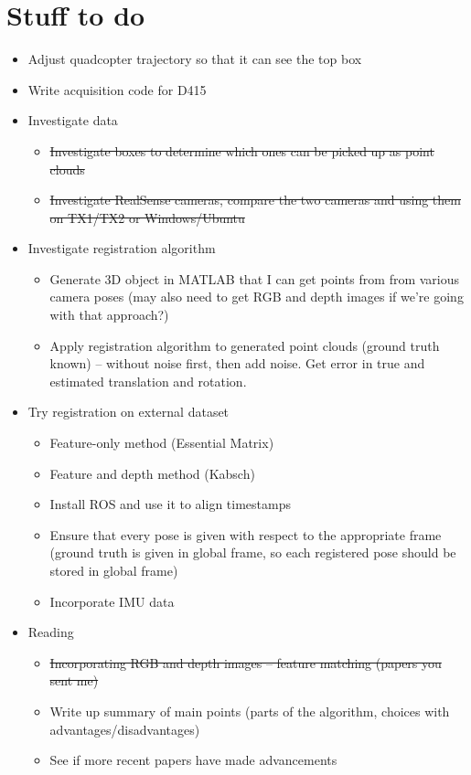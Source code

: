 \documentclass[12pt,a4paper]{article}
\begin{document}
\section{Stuff to do}
\begin{itemize}
\item Adjust quadcopter trajectory so that it can see the top box
\item Write acquisition code for D415
\item Investigate data
\begin{itemize}
\item \sout{Investigate boxes to determine which ones can be picked up as point clouds}
\item \sout{Investigate RealSense cameras, compare the two cameras and using them on TX1/TX2 or Windows/Ubuntu}
\end{itemize}
\item Investigate registration algorithm
\begin{itemize}
\item Generate 3D object in MATLAB that I can get points from from various camera poses (may also need to get RGB and depth images if we're going with that approach?)
\item Apply registration algorithm to generated point clouds (ground truth known) -- without noise first, then add noise. Get error in true and estimated translation and rotation.
\end{itemize}
\item Try registration on external dataset
\begin{itemize}
\item Feature-only method (Essential Matrix)
\item Feature and depth method (Kabsch)
\item Install ROS and use it to align timestamps
\item Ensure that every pose is given with respect to the appropriate frame (ground truth is given in global frame, so each registered pose should be stored in global frame)
\item Incorporate IMU data
\end{itemize}
\item Reading
\begin{itemize}
\item \sout{Incorporating RGB and depth images -- feature matching (papers you sent me)}
\item Write up summary of main points (parts of the algorithm, choices with advantages/disadvantages)
\item See if more recent papers have made advancements
\end{itemize}
\end{itemize}



\end{document}
